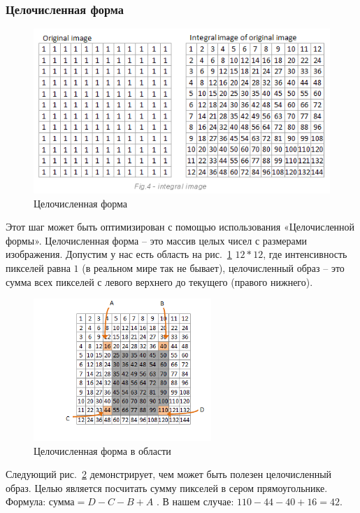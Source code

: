 \subsubsection{Целочисленная форма}
\begin{figure}[ht!]
  \centering
  \includegraphics[width=\textwidth]{inc/raster/design2-3.png}
  \caption{Целочисленная форма}
  \label{fig:fig23}
\end{figure}

Этот шаг может быть оптимизирован с помощью использования «Целочисленной формы». Целочисленная форма – это массив целых чисел с размерами изображения. Допустим у нас есть область  на рис.~\ref{fig:fig23} $12{*}12$, где интенсивность пикселей равна $1$ (в реальном мире так не бывает), целочисленный образ – это сумма всех пикселей с левого верхнего до текущего (правого нижнего).

\begin{figure}[ht!]
  \centering
  \includegraphics[width=0.6\textwidth]{inc/raster/design2-4.png}
  \caption{Целочисленная форма в области}
  \label{fig:fig24}
\end{figure}
Следующий рис.~\ref{fig:fig24} демонстрирует, чем может быть полезен целочисленный образ. Целью является посчитать сумму пикселей в сером прямоугольнике. 
Формула: $\text{сумма}=D{-}C{-}B{+}A$ . В нашем случае: $110-44-40+16=42$.

